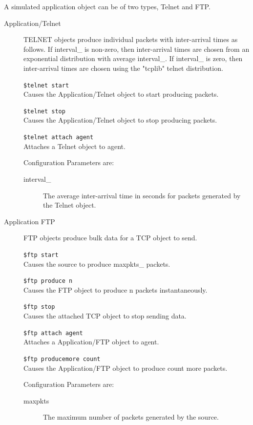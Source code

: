 A simulated application object can be of two types, Telnet and FTP.
\begin{description}
\item[Application/Telnet]
TELNET objects produce individual packets with inter-arrival times as
follows. If interval\_ is non-zero, then inter-arrival times are chosen
from an exponential distribution with average interval\_. If interval\_ is
zero, then inter-arrival times are chosen using the "tcplib" telnet
distribution. 

{\tt \$telnet start}\\
Causes the Application/Telnet object to start producing packets. 

{\tt \$telnet stop}\\
Causes the Application/Telnet object to stop producing packets. 

{\tt \$telnet attach \<agent\>}\\
Attaches a Telnet object to agent. 

Configuration Parameters are:
\begin{description}

\item[interval\_]
The average inter-arrival time in seconds for packets generated by the
Telnet object. 
\end{description}


\item[Application FTP]
FTP objects produce bulk data for a TCP object to send. 

{\tt \$ftp start}\\
Causes the source to produce maxpkts\_ packets. 

{\tt \$ftp produce \<n\>}\\
Causes the FTP object to produce n packets instantaneously. 

{\tt \$ftp stop}\\
Causes the attached TCP object to stop sending data. 

{\tt \$ftp attach agent}\\
Attaches a Application/FTP object to agent. 

{\tt \$ftp producemore \<count\>}\\
Causes the Application/FTP object to produce count more packets. 

Configuration Parameters are:
\begin{description}
\item[maxpkts] The maximum number of packets generated by the source. 
\end{description}
\end{description}

